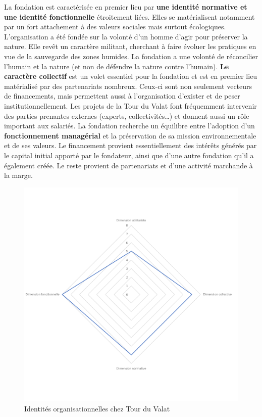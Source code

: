         La fondation est caractérisée en premier lieu par \textbf{une identité normative et une identité fonctionnelle} étroitement liées. Elles se matérialisent notamment par un fort attachement à des valeurs sociales mais surtout écologiques. L'organisation a été fondée sur la volonté d’un homme d’agir pour préserver la nature. Elle revêt un caractère militant, cherchant à faire évoluer les pratiques en vue de la sauvegarde des zones humides. La fondation a une volonté de réconcilier l’humain et la nature (et non de défendre la nature contre l’humain). \textbf{Le caractère collectif} est un volet essentiel pour la fondation et est en premier lieu matérialisé par des partenariats nombreux. Ceux-ci sont non seulement vecteurs de financements, mais permettent aussi à l’organisation d’exister et de peser institutionnellement. Les projets de la Tour du Valat font fréquemment intervenir des parties prenantes externes (experts, collectivités…) et donnent aussi un rôle important aux salariés. La fondation recherche un équilibre entre l’adoption d’un \textbf{fonctionnement managérial} et la préservation de sa mission environnementale et de ses valeurs. Le financement provient essentiellement des intérêts générés par le capital initial apporté par le fondateur, ainsi que d’une autre fondation qu’il a également créée. Le reste provient de partenariats et d’une activité marchande à la marge. \\


        \begin{figure}[h]
            \caption{Identités organisationnelles chez Tour du Valat}
            \label{figure:dimtourvalat}
            \includegraphics[width=\linewidth]{fig/radars/TdV.png}
        \end{figure}

